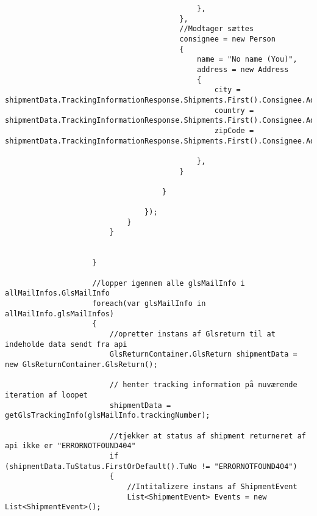 \begin{verbatim}
                                            },
                                        },
                                        //Modtager sættes
                                        consignee = new Person
                                        {
                                            name = "No name (You)",
                                            address = new Address
                                            {
                                                city = shipmentData.TrackingInformationResponse.Shipments.First().Consignee.Address.City,
                                                country = shipmentData.TrackingInformationResponse.Shipments.First().Consignee.Address.Country,
                                                zipCode = shipmentData.TrackingInformationResponse.Shipments.First().Consignee.Address.PostCode.ToString(),
        
                                            },
                                        }
        
                                    }
        
                                });
                            }
                        }
        
                        
                    }
        
                    //lopper igennem alle glsMailInfo i allMailInfos.GlsMailInfo
                    foreach(var glsMailInfo in allMailInfo.glsMailInfos)
                    {
                        //opretter instans af Glsreturn til at indeholde data sendt fra api
                        GlsReturnContainer.GlsReturn shipmentData = new GlsReturnContainer.GlsReturn();
        
                        // henter tracking information på nuværende iteration af loopet
                        shipmentData = getGlsTrackingInfo(glsMailInfo.trackingNumber);
        
                        //tjekker at status af shipment returneret af api ikke er "ERRORNOTFOUND404"
                        if (shipmentData.TuStatus.FirstOrDefault().TuNo != "ERRORNOTFOUND404")
                        {
                            //Intitalizere instans af ShipmentEvent
                            List<ShipmentEvent> Events = new List<ShipmentEvent>();
        

\end{verbatim}
